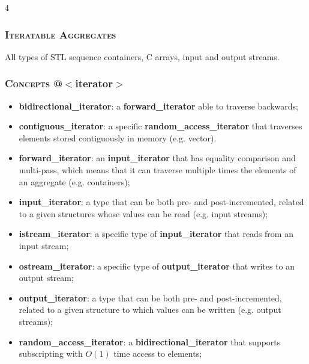 \documentclass[10pt]{article}
\begin{document}
\begin{multicols*}{4}
{\subsubsection*{\textsc{Iteratable Aggregates}} 
\noindent
All types of STL sequence containers, C arrays, input and output streams.

\subsubsection*{\textsc{Concepts} @$<$iterator$>$} 
\begin{itemize}[leftmargin=*,topsep=0.25pt]
  \setlength\itemsep{-1.8pt}
	\item \textbf{bidirectional\_iterator}: a \textbf{for\-ward\_ite\-ra\-tor} able to traverse backwards; 
	\item \textbf{contiguous\_iterator}: a specific \textbf{ran\-dom\_ac\-cess\_i\-te\-ra\-tor} that traverses elements stored contiguously in memory (e.g. vector). 
	\item \textbf{forward\_iterator}: an \textbf{input\_iterator} that has equality comparison and multi-pass, which means that it can traverse multiple times the elements of an aggregate (e.g. containers); 
	\item \textbf{input\_iterator}: a type that can be both pre- and post-incremented, related to a given structures whose values can be read (e.g. input streams);
	\item \textbf{istream\_iterator}: a specific type of \textbf{in\-put\_i\-te\-ra\-tor} that reads from an input stream;
	\item \textbf{ostream\_iterator}: a specific type of \textbf{out\-put\_i\-te\-ra\-tor} that writes to an output stream;
	\item \textbf{output\_iterator}: a type that can be both pre- and post-incremented, related to a given structure to which values can be written (e.g. output streams);
	\item \textbf{random\_access\_iterator}: a \textbf{bidirectional\_iterator} that supports subscripting with $O(1)$ time access to elements; 
\end{itemize}

}
\end{multicols*}
\end{document}
